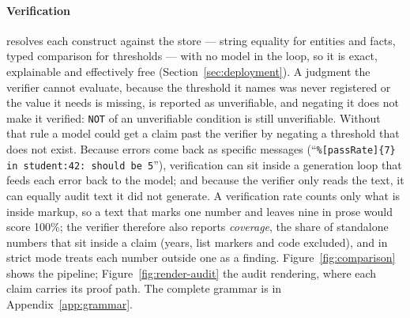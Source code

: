 \documentclass[11pt,a4paper]{article}
\begin{document}
\paragraph{Verification} resolves each construct against the store --- string equality for entities and facts, typed comparison for thresholds --- with no model in the loop, so it is exact, explainable and effectively free (Section~\ref{sec:deployment}). A judgment the verifier cannot evaluate, because the threshold it names was never registered or the value it needs is missing, is reported as unverifiable, and negating it does not make it verified: \texttt{NOT} of an unverifiable condition is still unverifiable. Without that rule a model could get a claim past the verifier by negating a threshold that does not exist. Because errors come back as specific messages (``\texttt{\%[passRate]\{7\} in student:42: should be 5}''), verification can sit inside a generation loop that feeds each error back to the model; and because the verifier only reads the text, it can equally audit text it did not generate. A verification rate counts only what is inside markup, so a text that marks one number and leaves nine in prose would score 100\%; the verifier therefore also reports \textit{coverage}, the share of standalone numbers that sit inside a claim (years, list markers and code excluded), and in strict mode treats each number outside one as a finding. Figure~\ref{fig:comparison} shows the pipeline; Figure~\ref{fig:render-audit} the audit rendering, where each claim carries its proof path. The complete grammar is in Appendix~\ref{app:grammar}.
\end{document}

